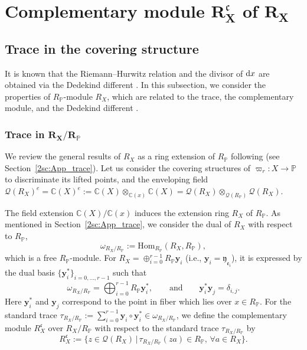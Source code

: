 \documentclass[10pt,a4paper]{amsart}
\def\CC{{\mathbb C}}
\def\PP{{\mathbb P}}
\def\bby{{\mathbf y}}
\def\cQ{{\mathcal Q}}
\def\fc{{\mathfrak c}}
\def\fe{{\mathfrak e}}
\def\fy{{\mathfrak y}}
\def\Hom{\mathrm{Hom}}
\numberwithin{equation}{section}
\begin{document}
\section[Complementary module R\_X\^{}c of R\_X]{Complementary module $\boldsymbol{R_X^\fc}$ of $\boldsymbol{R_X}$}\label{sec:CompM}

\subsection{Trace in the covering structure}\label{2ssc:TraceOperator}

It is known that the Riemann--Hurwitz relation and the divisor of ${\rm d} x$ are obtained via the Dedekind different \cite[Theorem~15.11]{Kunz2004}.
In this subsection, we consider the properties of $R_\PP$-module $R_X$, which are related to the trace, the complementary module, and the Dedekind different \cite[Chapter~15]{Kunz2004}.

\subsubsection[Trace in R\_X/R\_P]{Trace in $\boldsymbol{R_X/R_\PP}$}

We review the general results of $R_X$ as a ring extension of $R_\PP$ following \cite{Kunz2004} (see Section~\ref{2sc:App_trace}).
Let us consider the covering structures of $\varpi_r\colon X\to \PP$ to discriminate its lifted points, and the enveloping field $\cQ(R_X)^e=\CC(X)^e:=\CC(X)\otimes_{\CC(x)}\CC(X)=\cQ(R_X) \otimes_{\cQ(R_\PP)} \cQ(R_X)$.

The field extension $\CC(X)/\CC(x)$ induces the extension ring $R_X$ of $R_\PP$.
As mentioned in Section~\ref{2sc:App_trace}, we consider the dual of $R_X$ with respect to $R_\PP$,
\[
\omega_{R_X/R_\PP}:=\Hom_{R_\PP}(R_X, R_\PP),
\]
which is a free $R_\PP$-module.
For $R_X= \oplus_{i=0}^{r-1} R_\PP \bby_i$ (i.e., $\bby_i=\fy_{\fe_i}$), it is expressed by the dual basis $\{\bby_i^*\}_{i=0, \dots, r-1}$ such that
\begin{equation*}
\omega_{R_X/R_\PP}=\bigoplus_{i=0}^{r-1} R_\PP {\mathbf{y}_i^*},
\qquad\text{and}\qquad
\bby_i^* \bby_j = \delta_{i,j}.%
\end{equation*}
Here $\bby_i^*$ and $\bby_j$ correspond to the point in fiber which lies over $x\in R_\PP$.
For the standard trace $\tau_{R_X/R_\PP}:=\sum_{i=0}^{r-1} \bby_i \circ \bby_i^*\in \omega_{R_X/R_\PP}$, we define the complementary module $R_{X}^{\fc}$ over $R_X/R_\PP$ with respect to the standard trace $\tau_{R_X/R_\PP}$ by
\begin{equation}
R_{X}^{\fc}:=\{z \in \cQ(R_X)\, | \, \tau_{R_X/R_\PP}(z a) \in R_\PP, \, \forall a \in R_X\}.\label{2eq:RXc_tau}
\end{equation}
\end{document}
